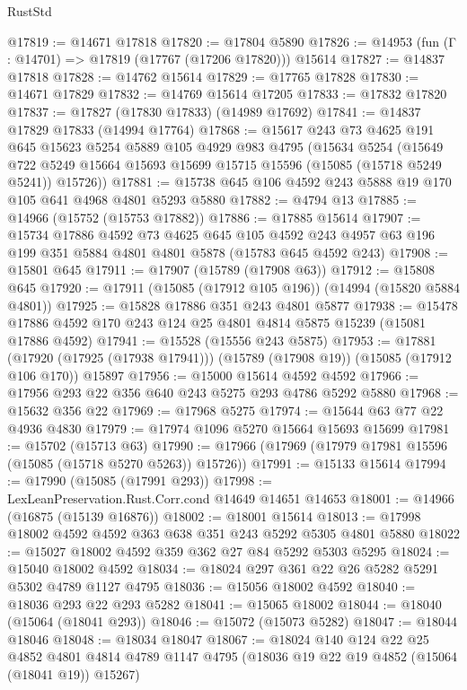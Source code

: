 \begin{lexlean}{RustStd}
\begin{coremodule}
@17819 := @14671 @17818
@17820 := @17804 @5890
@17826 := @14953 (fun (Γ : @14701) => @17819 (@17767 (@17206 @17820))) @15614
@17827 := @14837 @17818
@17828 := @14762 @15614
@17829 := @17765 @17828
@17830 := @14671 @17829
@17832 := @14769 @15614 @17205
@17833 := @17832 @17820
@17837 := @17827 (@17830 @17833) (@14989 @17692)
@17841 := @14837 @17829 @17833 (@14994 @17764)
@17868 := @15617
    @243
    @73
    @4625
    @191
    @645
    @15623
    @5254
    @5889
    @105
    @4929
    @983
    @4795
    (@15634
      @5254
      (@15649 @722 @5249 @15664 @15693 @15699 @15715 @15596 (@15085 (@15718 @5249 @5241)) @15726))
@17881 := @15738 @645 @106 @4592 @243 @5888 @19 @170 @105 @641 @4968 @4801 @5293 @5880
@17882 := @4794 @13
@17885 := @14966 (@15752 (@15753 @17882))
@17886 := @17885 @15614
@17907 := @15734
    @17886
    @4592
    @73
    @4625
    @645
    @105
    @4592
    @243
    @4957
    @63
    @196
    @199
    @351
    @5884
    @4801
    @4801
    @5878
    (@15783 @645 @4592 @243)
@17908 := @15801 @645
@17911 := @17907 (@15789 (@17908 @63))
@17912 := @15808 @645
@17920 := @17911 (@15085 (@17912 @105 @196)) (@14994 (@15820 @5884 @4801))
@17925 := @15828 @17886 @351 @243 @4801 @5877
@17938 := @15478 @17886 @4592 @170 @243 @124 @25 @4801 @4814 @5875 @15239 (@15081 @17886 @4592)
@17941 := @15528 (@15556 @243 @5875)
@17953 := @17881
    (@17920 (@17925 (@17938 @17941)))
    (@15789 (@17908 @19))
    (@15085 (@17912 @106 @170))
    @15897
@17956 := @15000 @15614 @4592 @4592
@17966 := @17956 @293 @22 @356 @640 @243 @5275 @293 @4786 @5292 @5880
@17968 := @15632 @356 @22
@17969 := @17968 @5275
@17974 := @15644 @63 @77 @22 @4936 @4830
@17979 := @17974 @1096 @5270 @15664 @15693 @15699
@17981 := @15702 (@15713 @63)
@17990 := @17966 (@17969 (@17979 @17981 @15596 (@15085 (@15718 @5270 @5263)) @15726))
@17991 := @15133 @15614
@17994 := @17990 (@15085 (@17991 @293))
@17998 := LexLeanPreservation.Rust.Corr.cond @14649 @14651 @14653
@18001 := @14966 (@16875 (@15139 @16876))
@18002 := @18001 @15614
@18013 := @17998 @18002 @4592 @4592 @363 @638 @351 @243 @5292 @5305 @4801 @5880
@18022 := @15027 @18002 @4592 @359 @362 @27 @84 @5292 @5303 @5295
@18024 := @15040 @18002 @4592
@18034 := @18024 @297 @361 @22 @26 @5282 @5291 @5302 @4789 @1127 @4795
@18036 := @15056 @18002 @4592
@18040 := @18036 @293 @22 @293 @5282
@18041 := @15065 @18002
@18044 := @18040 (@15064 (@18041 @293))
@18046 := @15072 (@15073 @5282)
@18047 := @18044 @18046
@18048 := @18034 @18047
@18067 := @18024
    @140
    @124
    @22
    @25
    @4852
    @4801
    @4814
    @4789
    @1147
    @4795
    (@18036 @19 @22 @19 @4852 (@15064 (@18041 @19)) @15267)

\end{coremodule}
\end{lexlean}
